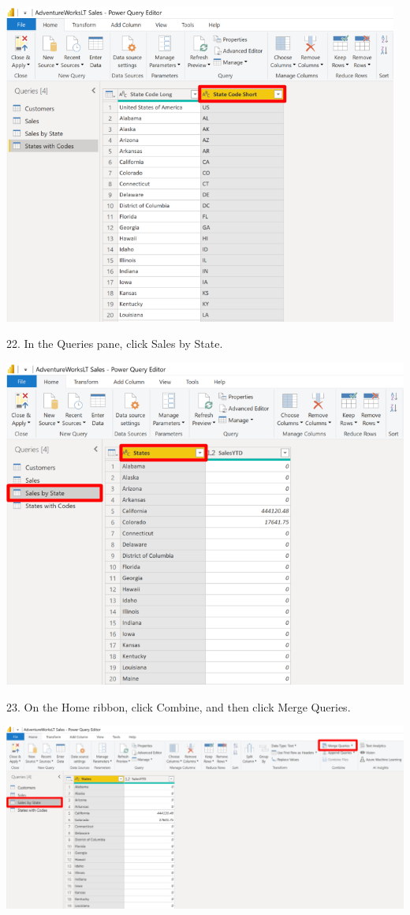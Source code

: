 \documentclass[12pt,letterpaper]{article}
\begin{document}
\begin{center}
    \includegraphics[width=13cm]{img/61.png}  
\end{center}
22. In the Queries pane, click Sales by State.
\begin{center}
    \includegraphics[width=15cm]{img/62.png}  
\end{center}
23. On the Home ribbon, click Combine, and then click Merge Queries.
\begin{center}
    \includegraphics[width=18cm]{img/63.png}  
\end{center}
\end{document}

